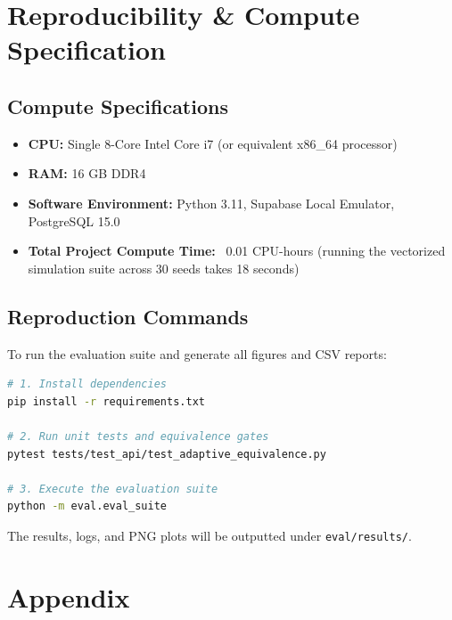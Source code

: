 \documentclass{article}
\begin{document}
\section{Reproducibility \& Compute Specification}

\subsection{Compute Specifications}
\begin{itemize}
    \item \textbf{CPU:} Single 8-Core Intel Core i7 (or equivalent x86\_64 processor)
    \item \textbf{RAM:} 16 GB DDR4
    \item \textbf{Software Environment:} Python 3.11, Supabase Local Emulator, PostgreSQL 15.0
    \item \textbf{Total Project Compute Time:} ~0.01 CPU-hours (running the vectorized simulation suite across 30 seeds takes 18 seconds)
\end{itemize}

\subsection{Reproduction Commands}
To run the evaluation suite and generate all figures and CSV reports:
\begin{lstlisting}[language=BASH]
# 1. Install dependencies
pip install -r requirements.txt

# 2. Run unit tests and equivalence gates
pytest tests/test_api/test_adaptive_equivalence.py

# 3. Execute the evaluation suite
python -m eval.eval_suite
\end{lstlisting}
The results, logs, and PNG plots will be outputted under \texttt{eval/results/}.





\newpage
\appendix
\section{Appendix}
\end{document}
